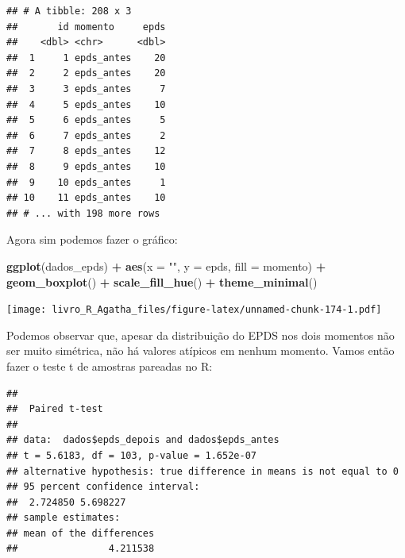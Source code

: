 \documentclass[
]{book}
\newenvironment{Shaded}{\begin{snugshade}}{\end{snugshade}}
\newcommand{\DataTypeTok}[1]{\textcolor[rgb]{0.13,0.29,0.53}{#1}}
\newcommand{\KeywordTok}[1]{\textcolor[rgb]{0.13,0.29,0.53}{\textbf{#1}}}
\newcommand{\NormalTok}[1]{#1}
\newcommand{\OperatorTok}[1]{\textcolor[rgb]{0.81,0.36,0.00}{\textbf{#1}}}
\newcommand{\OtherTok}[1]{\textcolor[rgb]{0.56,0.35,0.01}{#1}}
\newcommand{\StringTok}[1]{\textcolor[rgb]{0.31,0.60,0.02}{#1}}
\begin{document}
\begin{verbatim}
## # A tibble: 208 x 3
##       id momento     epds
##    <dbl> <chr>      <dbl>
##  1     1 epds_antes    20
##  2     2 epds_antes    20
##  3     3 epds_antes     7
##  4     5 epds_antes    10
##  5     6 epds_antes     5
##  6     7 epds_antes     2
##  7     8 epds_antes    12
##  8     9 epds_antes    10
##  9    10 epds_antes     1
## 10    11 epds_antes    10
## # ... with 198 more rows
\end{verbatim}

Agora sim podemos fazer o gráfico:

\begin{Shaded}
\begin{Highlighting}[]
\KeywordTok{ggplot}\NormalTok{(dados_epds) }\OperatorTok{+}
\StringTok{ }\KeywordTok{aes}\NormalTok{(}\DataTypeTok{x =} \StringTok{""}\NormalTok{, }\DataTypeTok{y =}\NormalTok{ epds, }\DataTypeTok{fill =}\NormalTok{ momento) }\OperatorTok{+}
\StringTok{ }\KeywordTok{geom_boxplot}\NormalTok{() }\OperatorTok{+}
\StringTok{ }\KeywordTok{scale_fill_hue}\NormalTok{() }\OperatorTok{+}
\StringTok{ }\KeywordTok{theme_minimal}\NormalTok{()}
\end{Highlighting}
\end{Shaded}

\texttt{[image: livro\_R\_Agatha\_files/figure-latex/unnamed-chunk-174-1.pdf]}

Podemos observar que, apesar da distribuição do EPDS nos dois momentos não ser muito simétrica, não há valores atípicos em nenhum momento. Vamos então fazer o teste t de amostras pareadas no R:

\begin{Shaded}
\end{Shaded}

\begin{verbatim}
## 
## 	Paired t-test
## 
## data:  dados$epds_depois and dados$epds_antes
## t = 5.6183, df = 103, p-value = 1.652e-07
## alternative hypothesis: true difference in means is not equal to 0
## 95 percent confidence interval:
##  2.724850 5.698227
## sample estimates:
## mean of the differences 
##                4.211538
\end{verbatim}
\end{document}
